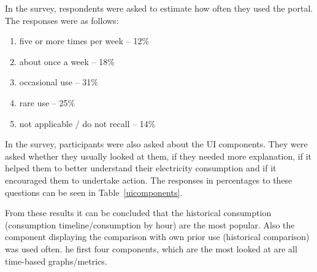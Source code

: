 \documentclass[journal]{vgtc}                %
\begin{document}
In the survey, respondents were asked to estimate how often they used the portal. The responses were as follows:
\begin{enumerate}
\item five or more times per week -- 12\%
\item about once a week -- 18\%
\item occasional use -- 31\%
\item rare use -- 25\%
\item not applicable / do not recall -- 14\%
\end{enumerate}

In the survey, participants were also asked about the UI components. They were asked whether they usually looked at them, if they needed more explanation, if it helped them to better understand their electricity consumption and if it encouraged them to undertake action. The responses in percentages to these questions can be seen in Table~\ref{uicomponents}.

From these results it can be concluded that the historical consumption (consumption timeline/consumption by hour) are the most popular. Also the component displaying the comparison with own prior use (historical comparison) was used often.
he first four components, which are the most looked at are all time-based graphs/metrics. 
\end{document}
